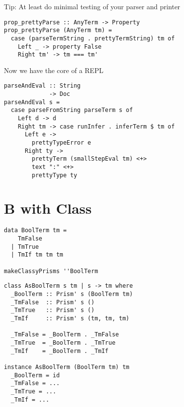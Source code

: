 \documentclass[aspectration=169]{beamer}
\begin{document}
\begin{frame}[fragile]
Tip: At least do minimal testing of your parser and printer
  \begin{verbatim}
prop_prettyParse :: AnyTerm -> Property
prop_prettyParse (AnyTerm tm) =
  case (parseTermString . prettyTermString) tm of
    Left _ -> property False
    Right tm' -> tm === tm'
  \end{verbatim}
\end{frame} 

\begin{frame}[fragile]
  \begin{center}
   Now we have the core of a REPL 
  \end{center}
  \begin{verbatim}
parseAndEval :: String
             -> Doc
parseAndEval s =
  case parseFromString parseTerm s of
    Left d -> d
    Right tm -> case runInfer . inferTerm $ tm of
      Left e -> 
        prettyTypeError e
      Right ty ->
        prettyTerm (smallStepEval tm) <+> 
        text ":" <+> 
        prettyType ty
  \end{verbatim}
\end{frame} 

\section{B with Class}

\begin{frame}[fragile]
  \begin{verbatim}
data BoolTerm tm =
    TmFalse
  | TmTrue
  | TmIf tm tm tm

makeClassyPrisms ''BoolTerm
  \end{verbatim}
\end{frame} 

\begin{frame}[fragile]
  \begin{verbatim}
class AsBoolTerm s tm | s -> tm where
  _BoolTerm :: Prism' s (BoolTerm tm)
  _TmFalse  :: Prism' s ()
  _TmTrue   :: Prism' s ()
  _TmIf     :: Prism' s (tm, tm, tm)

  _TmFalse = _BoolTerm . _TmFalse
  _TmTrue  = _BoolTerm . _TmTrue
  _TmIf    = _BoolTerm . _TmIf

instance AsBoolTerm (BoolTerm tm) tm
  _BoolTerm = id
  _TmFalse = ...
  _TmTrue = ...
  _TmIf = ...
  \end{verbatim}
\end{frame} 
\end{document}
